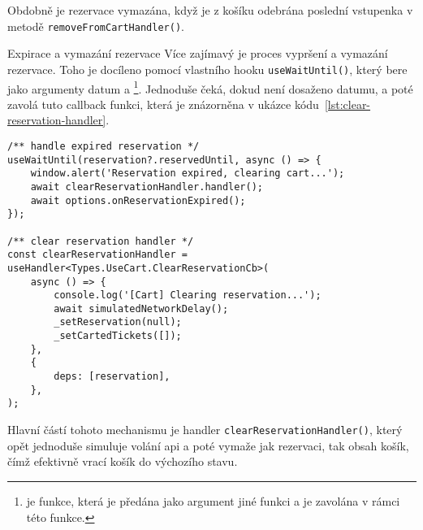 Obdobně je rezervace vymazána, když je z košíku odebrána poslední vstupenka v metodě \texttt{removeFromCartHandler()}.

\begin{subsection}{Expirace a vymazání rezervace}
    \label{subsec:implementace-rezervace-expirace}
    Více zajímavý je proces vypršení a vymazání rezervace.
    Toho je docíleno pomocí vlastního hooku \texttt{useWaitUntil()}, který bere jako argumenty datum a \footnote{ je funkce, která je předána jako argument jiné funkci a je zavolána v rámci této funkce.}.
    Jednoduše čeká, dokud není dosaženo datumu, a poté zavolá tuto callback funkci, která je znázorněna v ukázce kódu~\ref{lst:clear-reservation-handler}.

    \begin{listing}[H]
        \begin{verbatim}
/** handle expired reservation */
useWaitUntil(reservation?.reservedUntil, async () => {
	window.alert('Reservation expired, clearing cart...');
	await clearReservationHandler.handler();
	await options.onReservationExpired();
});

/** clear reservation handler */
const clearReservationHandler = useHandler<Types.UseCart.ClearReservationCb>(
	async () => {
		console.log('[Cart] Clearing reservation...');
		await simulatedNetworkDelay();
		_setReservation(null);
		_setCartedTickets([]);
	},
	{
		deps: [reservation],
	},
);
        \end{verbatim}
        \caption{Proces expirace rezervace s metodou \texttt{clearReservationHandler()}}
        \label{lst:clear-reservation-handler}
    \end{listing}

    Hlavní částí tohoto mechanismu je handler \texttt{clearReservationHandler()}, který opět jednoduše simuluje volání \ac{api} a poté vymaže jak rezervaci, tak obsah košík, čímž efektivně vrací košík do výchozího stavu.
\end{subsection}

